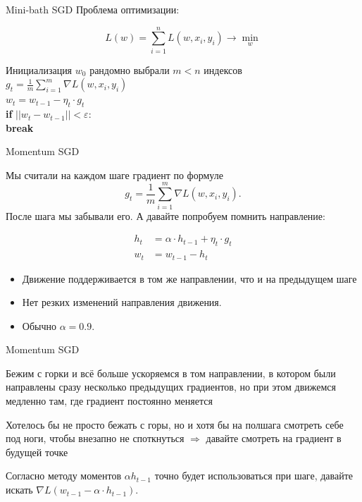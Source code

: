 \documentclass[notes,12pt, aspectratio=169]{beamer}
\newcommand{\pgr}[1]{{\color{green} \textbf{#1}}}
\newenvironment{wideitemize}{\itemize\addtolength{\itemsep}{10pt}}{\enditemize}
\begin{document}
\begin{frame}[fragile]{Mini-bath SGD}
Проблема оптимизации: 

\[   
L(w) = \sum_{i=1}^n L(w, x_i, y_i) \to \min_{w}
\]

Инициализация $w_0$ 
\pgr{\hspace{15pt}} рандомно выбрали $m < n$ индексов \\
\pgr{\hspace{15pt}} $g_t =\frac{1}{m}\sum_{i=1}^m  \nabla L(w, x_i, y_i)$ \\
\pgr{\hspace{15pt}} $w_t = w _{t-1} - \eta_t \cdot g_t   $ \\
\pgr{\hspace{15pt} if} $||w_t - w_{t-1}|| < \varepsilon:$ \\
\pgr{\hspace{30pt} break}
\end{frame}


\begin{frame}{Momentum SGD}

Мы считали на каждом шаге градиент по формуле  \[g_t =\frac{1}{m}\sum_{i=1}^m  \nabla L(w, x_i, y_i).\] После шага мы забывали его. {\color{red} А давайте попробуем помнить направление:} 

\begin{equation*}
	\begin{aligned}
	h_t &= \alpha \cdot h_{t-1} + \eta_t \cdot g_t \\
	w_t &= w_{t-1} - h_t
	\end{aligned}	
\end{equation*}

\begin{itemize}
	\item Движение поддерживается в том же направлении, что и на предыдущем шаге
	\item Нет резких изменений направления движения.
	\item Обычно $\alpha = 0.9$.
\end{itemize}
\end{frame}


\begin{frame}{Momentum SGD}
\begin{wideitemize}
	\item Бежим с горки и всё больше ускоряемся в том направлении, в котором были направлены сразу несколько предыдущих градиентов, но при этом движемся медленно там, где градиент постоянно меняется
	\item Хотелось бы не просто бежать с горы, но и хотя бы на полшага смотреть себе под ноги, чтобы внезапно не споткнуться $\Rightarrow$ давайте смотреть на градиент в будущей точке
	\item Согласно методу моментов $\alpha h_{t-1}$ точно будет использоваться при шаге, давайте искать $\nabla L(w_{t-1} - \alpha \cdot h_{t-1})$.
\end{wideitemize}
\end{frame}
\end{document}
